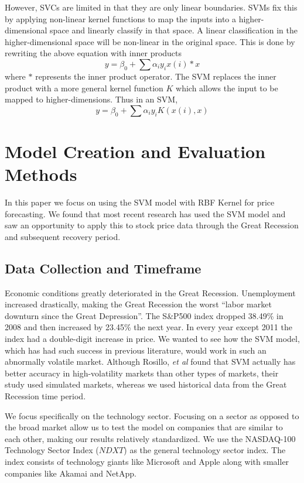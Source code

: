 \documentclass[pageno]{jpaper}
\begin{document}
However, SVCs are limited in that they are only linear boundaries. SVMs fix this by applying non-linear kernel functions to map the inputs into a higher-dimensional space and linearly classify in that space. A linear classification in the higher-dimensional space will be non-linear in the original space. This is done by rewriting the above equation with inner products
$$y = \beta_0 + \sum \alpha_iy_ix(i)*x$$
where $*$ represents the inner product operator. The SVM replaces the inner product with a more general kernel function $K$ which allows the input to be mapped to higher-dimensions. Thus in an SVM,
$$y = \beta_0 + \sum \alpha_i y_i K(x(i),x)$$

\section{Model Creation and Evaluation Methods}
In this paper we focus on using the SVM model with RBF Kernel for price forecasting. We found that most recent research has used the SVM model and saw an opportunity to apply this to stock price data through the Great Recession and subsequent recovery period. 

\subsection{Data Collection and Timeframe}
\label{subsec: data}
Economic conditions greatly deteriorated in the Great Recession. Unemployment increased drastically, making the Great Recession the worst ``labor market downturn since the Great Depression''\cite{katz}. The S\&P500 index dropped 38.49\% in 2008 and then increased by 23.45\% the next year\cite{sp500returns}. In every year except 2011 the index had a double-digit increase in price. We wanted to see how the SVM model, which has had such success in previous literature, would work in such an abnormally volatile market. Although Rosillo, {\em et al} found that SVM actually has better accuracy in high-volatility markets than other types of markets, their study used simulated markets, whereas we used historical data from the Great Recession time period\cite{rosillo}.

We focus specifically on the technology sector. Focusing on a sector as opposed to the broad market allow us to test the model on companies that are similar to each other, making our results relatively standardized. We use the NASDAQ-100 Technology Sector Index ($NDXT$) as the general technology sector index. The index consists of technology giants like Microsoft and Apple along with smaller companies like Akamai and NetApp. 
\end{document}
